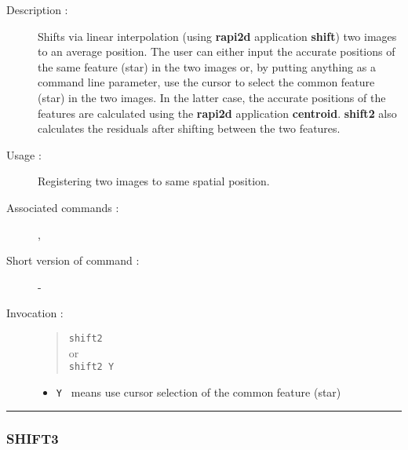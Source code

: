 \begin{description}

\item[Description :] Shifts via linear interpolation (using {\bf
rapi2d} application {\bf shift}) two images to an average position.
The user can either input the accurate positions of the same feature
(star) in the two images or, by putting anything as a command line
parameter, use the cursor to select the common feature (star) in the
two images. In the latter case, the accurate positions of the features
are calculated using the {\bf rapi2d} application {\bf centroid}.  {\bf
shift2} also calculates the residuals after shifting between the two
features.

\item[Usage :] Registering two images to same spatial position.

\item[Associated commands :] {\tt {}},
{\tt {}}
\item[Short version of command :] -
\item[Invocation :]

\begin{quote}{\tt  shift2 }\\
or \\
{\tt shift2 Y }
\end{quote}

\begin{itemize}

\item {\tt Y } means use cursor selection of the common feature (star)
\end{itemize}

\end{description}

\hrule
\subsubsection*{\label{SHIFT3}SHIFT3}

